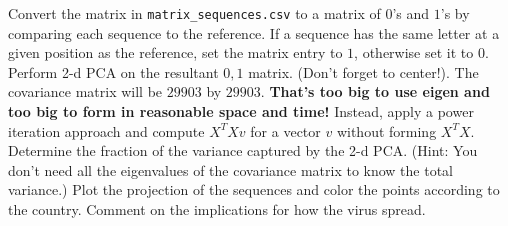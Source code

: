 \documentclass[11pt]{article}
\begin{document}
\begin{enumerate}
Convert the matrix in \verb+matrix_sequences.csv+ to a matrix of $0$'s and $1$'s by comparing each sequence to the reference.   If a sequence has the same letter at a given position as the reference, set the matrix entry to $1$, otherwise set it to $0$.   Perform 2-d PCA on the resultant $0,1$ matrix.   (Don't forget to center!).  The covariance matrix will be $29903$ by $29903$.  \textbf{That's too big to use \textbf{eigen} and too big to form in reasonable space and time!}  Instead, apply a power iteration approach and compute $X^TXv$ for a vector $v$ without forming $X^TX$.  Determine the fraction of the variance captured by the 2-d PCA.  (Hint:  You don't need all the eigenvalues of the covariance matrix to know the total variance.)   Plot the projection of the sequences and color the points according to the country.  Comment on the implications for how the virus spread.
%


\end{enumerate}
\end{document}
